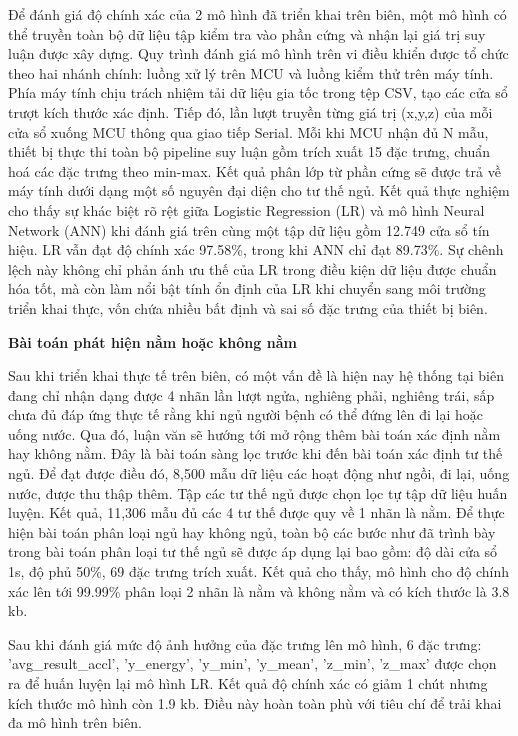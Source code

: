 Để đánh giá độ chính xác của 2 mô hình đã triển khai trên biên, một mô
hình có thể truyền toàn bộ dữ liệu tập kiểm
tra vào phần cứng và nhận lại giá trị suy luận được xây dựng.
Quy trình đánh giá mô hình trên vi điều khiển được tổ chức theo hai nhánh
chính: luồng xử lý trên MCU và luồng kiểm thử trên máy tính. Phía máy tính chịu
trách nhiệm tải dữ liệu gia tốc trong tệp CSV, tạo các cửa sổ trượt kích thước xác định. Tiếp đó, lần lượt truyền từng giá trị
(x,y,z) của mỗi cửa sổ xuống MCU thông qua giao tiếp Serial. Mỗi khi MCU nhận đủ
N mẫu, thiết bị thực thi toàn bộ pipeline suy luận gồm trích xuất 15 đặc trưng,
chuẩn hoá các đặc trưng theo min-max. Kết quả phân lớp từ phần cứng sẽ được trả về máy tính dưới dạng một số
nguyên đại diện cho tư thế ngủ.
Kết quả thực nghiệm cho thấy sự khác biệt rõ rệt giữa
Logistic Regression (LR) và mô hình Neural Network (ANN) khi đánh giá trên cùng
một tập dữ liệu gồm 12.749 cửa sổ tín hiệu. LR vẫn đạt độ chính xác 97.58\%,
trong khi ANN chỉ đạt 89.73\%. Sự chênh lệch này không chỉ phản ánh ưu thế của
LR trong điều kiện dữ liệu được chuẩn hóa tốt, mà còn làm nổi bật tính ổn định
của LR khi chuyển sang môi trường triển khai thực, vốn chứa nhiều bất định và
sai số đặc trưng của thiết bị biên.

\textbf{Bài toán phát hiện nằm hoặc không nằm}

Sau khi triển khai thực tế trên biên, có một vấn đề là hiện nay hệ thống tại
biên đang chỉ nhận dạng được 4 nhãn lần lượt ngửa, nghiêng phải, nghiêng trái,
sấp chưa đủ đáp ứng thực tế rằng khi ngủ người bệnh có thể đứng lên đi lại hoặc
uống nước. Qua đó, luận văn sẽ hướng tới mở rộng thêm bài toán xác định nằm hay
không nằm. Đây là bài toán sàng lọc trước khi đến bài toán xác định tư thế ngủ.
Để đạt được điều đó, 8,500 mẫu dữ liệu các hoạt động như ngồi, đi lại, uống
nước, được thu thập thêm. Tập các tư thế ngủ được chọn lọc tự tập dữ liệu huấn
luyện. Kết quả, 11,306 mẫu đủ các 4 tư thế được quy về 1 nhãn là nằm. Để thực
hiện bài toán phân loại ngủ hay không ngủ, toàn bộ các bước như đã trình bày
trong bài toán phân loại tư thế ngủ sẽ được áp dụng lại bao gồm: độ dài cửa sổ
1s, độ phủ 50\%, 69 đặc trưng trích xuất. Kết quả cho thấy, mô hình cho độ
chính xác lên tới 99.99\% phân loại 2 nhãn là nằm và không nằm và có kích thước
là 3.8 kb.

Sau khi đánh giá mức độ ảnh hưởng của đặc trưng lên mô hình, 6 đặc trưng:
'avg\_result\_accl', 'y\_energy', 'y\_min', 'y\_mean', 'z\_min', 'z\_max' được
chọn ra để huấn luyện lại mô hình LR. Kết quả độ chính xác có giảm 1 chút nhưng
kích thước mô hình còn 1.9 kb. Điều này hoàn toàn phù với tiêu chí để trải khai
đa mô hình trên biên.

